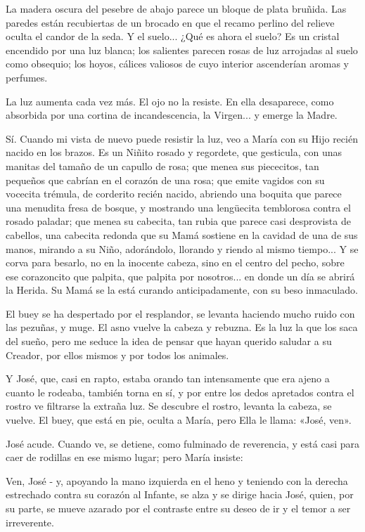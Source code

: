 \documentclass[12pt, twoside, openright]{book} %
\begin{document}
La madera oscura del pesebre de abajo parece un bloque de plata bruñida. Las paredes están recubiertas de un brocado en que el recamo perlino del relieve oculta el candor de la seda. Y el suelo... ¿Qué es ahora el suelo? Es un cristal encendido por una luz blanca; los salientes parecen rosas de luz arrojadas al suelo como obsequio; los hoyos, cálices valiosos de cuyo interior ascenderían aromas y perfumes. 

La luz aumenta cada vez más. El ojo no la resiste. En ella desaparece, como absorbida por una cortina de incandescencia, la Virgen... y emerge la Madre. 

Sí. Cuando mi vista de nuevo puede resistir la luz, veo a María con su Hijo recién nacido en los brazos. Es un Niñito rosado y regordete, que gesticula, con unas manitas del tamaño de un capullo de rosa; que menea sus piececitos, tan pequeños que cabrían en el corazón de una rosa; que emite vagidos con su vocecita trémula, de corderito recién nacido, abriendo una boquita que parece una menudita fresa de bosque, y mostrando una lengüecita temblorosa contra el rosado paladar; que menea su cabecita, tan rubia que parece casi desprovista de cabellos, una cabecita redonda que su Mamá sostiene en la cavidad de una de sus manos, mirando a su Niño, adorándolo, llorando y riendo al mismo tiempo... Y se corva para besarlo, no en la inocente cabeza, sino en el centro del pecho, sobre ese corazoncito que palpita, que palpita por nosotros... en donde un día se abrirá la Herida. Su Mamá se la está curando anticipadamente, con su beso inmaculado. 

El buey se ha despertado por el resplandor, se levanta haciendo mucho ruido con las pezuñas, y muge. El asno vuelve la cabeza y rebuzna. Es la luz la que los saca del sueño, pero me seduce la idea de pensar que hayan querido saludar a su Creador, por ellos mismos y por todos los animales. 

Y José, que, casi en rapto, estaba orando tan intensamente que era ajeno a cuanto le rodeaba, también torna en sí, y por entre los dedos apretados contra el rostro ve filtrarse la extraña luz. Se descubre el rostro, levanta la cabeza, se vuelve. El buey, que está en pie, oculta a María, pero Ella le llama: «José, ven». 

José acude. Cuando ve, se detiene, como fulminado de reverencia, y está casi para caer de rodillas en ese mismo lugar; pero María insiste: 

Ven, José - y, apoyando la mano izquierda en el heno y teniendo con la derecha estrechado contra su corazón al Infante, se alza y se dirige hacia José, quien, por su parte, se mueve azarado por el contraste entre su deseo de ir y el temor a ser irreverente. 
\end{document}
